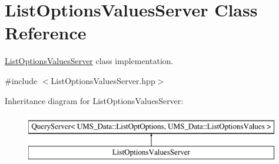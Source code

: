 \hypertarget{classListOptionsValuesServer}{
\section{ListOptionsValuesServer Class Reference}
\label{classListOptionsValuesServer}
}


\hyperlink{classListOptionsValuesServer}{ListOptionsValuesServer} class implementation.  




{\ttfamily \#include $<$ListOptionsValuesServer.hpp$>$}

Inheritance diagram for ListOptionsValuesServer:\begin{figure}[H]
\begin{center}
\leavevmode
\includegraphics[height=2.000000cm]{classListOptionsValuesServer}
\end{center}
\end{figure}
